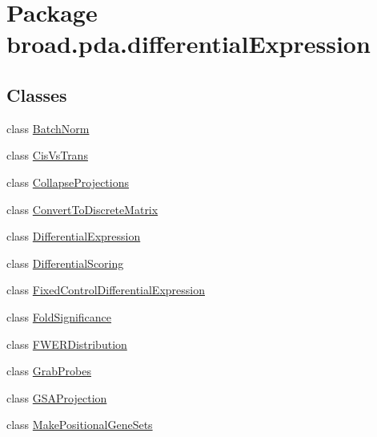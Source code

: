 \hypertarget{namespacebroad_1_1pda_1_1differential_expression}{\section{Package broad.\+pda.\+differential\+Expression}
\label{namespacebroad_1_1pda_1_1differential_expression}
}
\subsection*{Classes}
\begin{DoxyCompactItemize}
\item 
class \hyperlink{classbroad_1_1pda_1_1differential_expression_1_1_batch_norm}{Batch\+Norm}
\item 
class \hyperlink{classbroad_1_1pda_1_1differential_expression_1_1_cis_vs_trans}{Cis\+Vs\+Trans}
\item 
class \hyperlink{classbroad_1_1pda_1_1differential_expression_1_1_collapse_projections}{Collapse\+Projections}
\item 
class \hyperlink{classbroad_1_1pda_1_1differential_expression_1_1_convert_to_discrete_matrix}{Convert\+To\+Discrete\+Matrix}
\item 
class \hyperlink{classbroad_1_1pda_1_1differential_expression_1_1_differential_expression}{Differential\+Expression}
\item 
class \hyperlink{classbroad_1_1pda_1_1differential_expression_1_1_differential_scoring}{Differential\+Scoring}
\item 
class \hyperlink{classbroad_1_1pda_1_1differential_expression_1_1_fixed_control_differential_expression}{Fixed\+Control\+Differential\+Expression}
\item 
class \hyperlink{classbroad_1_1pda_1_1differential_expression_1_1_fold_significance}{Fold\+Significance}
\item 
class \hyperlink{classbroad_1_1pda_1_1differential_expression_1_1_f_w_e_r_distribution}{F\+W\+E\+R\+Distribution}
\item 
class \hyperlink{classbroad_1_1pda_1_1differential_expression_1_1_grab_probes}{Grab\+Probes}
\item 
class \hyperlink{classbroad_1_1pda_1_1differential_expression_1_1_g_s_a_projection}{G\+S\+A\+Projection}
\item 
class \hyperlink{classbroad_1_1pda_1_1differential_expression_1_1_make_positional_gene_sets}{Make\+Positional\+Gene\+Sets}
\item 

\end{DoxyCompactItemize}
